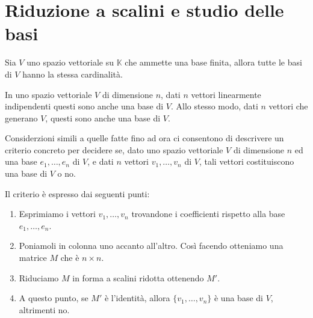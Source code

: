 \section{Riduzione a scalini e studio delle basi}

\begin{theorem}
	Sia $V$ uno spazio vettoriale su $\mathbb{K}$ che ammette una base
	finita, allora tutte le basi di $V$ hanno la stessa cardinalit\`a.
\end{theorem}

\begin{corollary}
	In uno spazio vettoriale $V$ di dimensione $n$, dati $n$ vettori
	linearmente indipendenti questi sono anche una base di $V$. Allo
	stesso modo, dati $n$ vettori che generano $V$, questi sono anche una
	base di $V$.
\end{corollary}

Considerzioni simili a quelle fatte fino ad ora ci consentono di descrivere
un criterio concreto per decidere se, dato uno spazio vettoriale $V$ di
dimensione $n$ ed una base $e_1, \dots, e_n$ di $V$, e dati $n$ vettori
$v_1, \dots, v_n$ di $V$, tali vettori costituiscono una base di $V$ o no.

Il criterio \`e espresso dai seguenti punti:
\begin{enumerate}
	\item Esprimiamo i vettori $v_1, \dots, v_n$ trovandone i coefficienti rispetto
	      alla base $e_1, \dots, e_n$.
	\item Poniamoli in colonna uno accanto all'altro. Cos\`i facendo otteniamo una
	      matrice $M$ che \`e $n \times n$.
	\item Riduciamo $M$ in forma a scalini ridotta ottenendo $M'$.
	\item A questo punto, se $M'$ \`e l'identit\`a, allora $\{v_1, \dots, v_n\}$
	      \`e una base di $V$, altrimenti no.
\end{enumerate}

